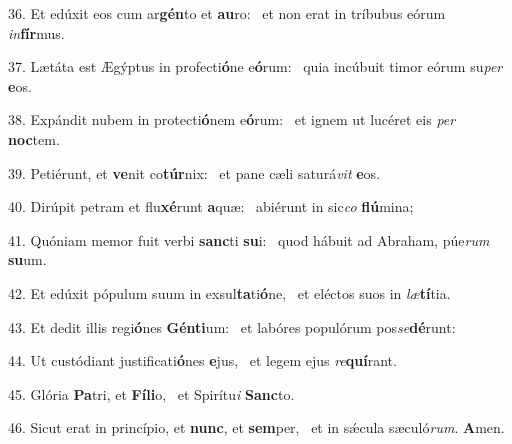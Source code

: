 36. Et edúxit eos cum ar\textbf{gén}to et \textbf{au}ro: \ast\  et non erat in tríbubus eórum \textit{in}\textbf{fír}mus.\

37. Lætáta est Ægýptus in profecti\textbf{ó}ne e\textbf{ó}rum: \ast\  quia incúbuit timor eórum su\textit{per} \textbf{e}os.\

38. Expándit nubem in protecti\textbf{ó}nem e\textbf{ó}rum: \ast\  et ignem ut lucéret eis \textit{per} \textbf{noc}tem.\

39. Petiérunt, et \textbf{ve}nit co\textbf{túr}nix: \ast\  et pane cæli saturá\textit{vit} \textbf{e}os.\

40. Dirúpit petram et flu\textbf{xé}runt \textbf{a}quæ: \ast\  abiérunt in sic\textit{co} \textbf{flú}mina;\

41. Quóniam memor fuit verbi \textbf{sanc}ti \textbf{su}i: \ast\  quod hábuit ad Abraham, púe\textit{rum} \textbf{su}um.\

42. Et edúxit pópulum suum in exsul\textbf{ta}ti\textbf{ó}ne, \ast\  et eléctos suos in \textit{læ}\textbf{tí}tia.\

43. Et dedit illis regi\textbf{ó}nes \textbf{Gén}\textbf{ti}um: \ast\  et labóres populórum pos\textit{se}\textbf{dé}runt:\

44. Ut custódiant justificati\textbf{ó}nes \textbf{e}jus, \ast\  et legem ejus \textit{re}\textbf{quí}rant.\

45. Glória \textbf{Pa}tri, et \textbf{Fí}\textbf{li}o, \ast\  et Spirítu\textit{i} \textbf{Sanc}to.\

46. Sicut erat in princípio, et \textbf{nunc}, et \textbf{sem}per, \ast\  et in sǽcula sæculó\textit{rum}. \textbf{A}men.\

